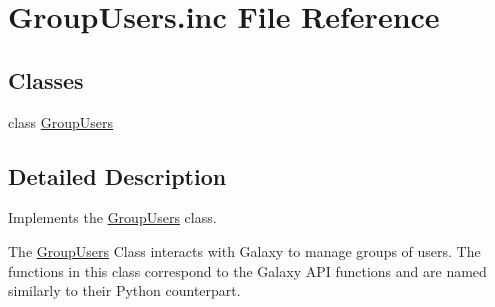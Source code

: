 \hypertarget{GroupUsers_8inc}{}\section{Group\+Users.\+inc File Reference}
\label{GroupUsers_8inc}
\subsection*{Classes}
\begin{DoxyCompactItemize}
\item 
class \hyperlink{classGroupUsers}{Group\+Users}
\end{DoxyCompactItemize}


\subsection{Detailed Description}
Implements the \hyperlink{classGroupUsers}{Group\+Users} class.

The \hyperlink{classGroupUsers}{Group\+Users} Class interacts with Galaxy to manage groups of users. The functions in this class correspond to the Galaxy A\+PI functions and are named similarly to their Python counterpart. 